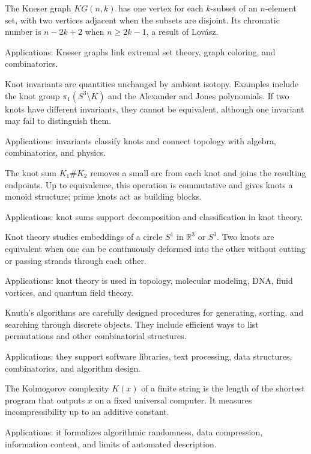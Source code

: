 The Kneser graph $KG(n,k)$ has one vertex for each $k$-subset of an $n$-element set, with two vertices adjacent when the subsets are disjoint. Its chromatic number is $n-2k+2$ when $n\geq2k-1$, a result of Lovász. \par\noindent Applications: Kneser graphs link extremal set theory, graph coloring, and combinatorics.

Knot invariants are quantities unchanged by ambient isotopy. Examples include the knot group $\pi_1(S^3\setminus K)$ and the Alexander and Jones polynomials. If two knots have different invariants, they cannot be equivalent, although one invariant may fail to distinguish them. \par\noindent Applications: invariants classify knots and connect topology with algebra, combinatorics, and physics.

The knot sum $K_1\#K_2$ removes a small arc from each knot and joins the resulting endpoints. Up to equivalence, this operation is commutative and gives knots a monoid structure; prime knots act as building blocks. \par\noindent Applications: knot sums support decomposition and classification in knot theory.

Knot theory studies embeddings of a circle $S^1$ in $\mathbb R^3$ or $S^3$. Two knots are equivalent when one can be continuously deformed into the other without cutting or passing strands through each other. \par\noindent Applications: knot theory is used in topology, molecular modeling, DNA, fluid vortices, and quantum field theory.

Knuth's algorithms are carefully designed procedures for generating, sorting, and searching through discrete objects. They include efficient ways to list permutations and other combinatorial structures. \par\noindent Applications: they support software libraries, text processing, data structures, combinatorics, and algorithm design.

The Kolmogorov complexity $K(x)$ of a finite string is the length of the shortest program that outputs $x$ on a fixed universal computer. It measures incompressibility up to an additive constant. \par\noindent Applications: it formalizes algorithmic randomness, data compression, information content, and limits of automated description.

